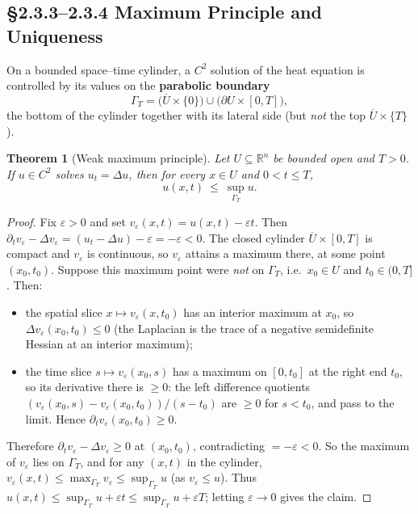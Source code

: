 ﻿\documentclass[12pt, a4paper]{article}
\renewcommand{\_}{\origunderscore\allowbreak}
\theoremstyle{definition}
\theoremstyle{plain}
\newtheorem{theorem}{Theorem}[section]
\begin{document}
\subsection{§2.3.3–2.3.4 Maximum Principle and Uniqueness}

On a bounded space–time cylinder, a $C^2$ solution of the heat equation is controlled by its
values on the \textbf{parabolic boundary}
\[
  \Gamma_T = \bigl(\overline U \times \{0\}\bigr) \cup \bigl(\partial U \times [0,T]\bigr),
\]
the bottom of the cylinder together with its lateral side (but \emph{not} the top
$\overline U \times \{T\}$).

\begin{theorem}[Weak maximum principle]
Let $U\subseteq\mathbb{R}^n$ be bounded open and $T>0$. If $u\in C^2$ solves $u_t=\Delta u$,
then for every $x\in U$ and $0<t\le T$,
\[
  u(x,t)\ \le\ \sup_{\Gamma_T} u .
\]
\end{theorem}

\begin{proof}
Fix $\varepsilon>0$ and set $v_\varepsilon(x,t)=u(x,t)-\varepsilon t$. Then
$\partial_t v_\varepsilon-\Delta v_\varepsilon=(u_t-\Delta u)-\varepsilon=-\varepsilon<0$.
The closed cylinder $\overline U\times[0,T]$ is compact and $v_\varepsilon$ is continuous, so
$v_\varepsilon$ attains a maximum there, at some point $(x_0,t_0)$. Suppose this maximum point
were \emph{not} on $\Gamma_T$, i.e.\ $x_0\in U$ and $t_0\in(0,T]$. Then:
\begin{itemize}
  \item the spatial slice $x\mapsto v_\varepsilon(x,t_0)$ has an interior maximum at $x_0$, so
    $\Delta v_\varepsilon(x_0,t_0)\le 0$ (the Laplacian is the trace of a negative semidefinite
    Hessian at an interior maximum);
  \item the time slice $s\mapsto v_\varepsilon(x_0,s)$ has a maximum on $[0,t_0]$ at the right
    end $t_0$, so its derivative there is $\ge 0$: the left difference quotients
    $(v_\varepsilon(x_0,s)-v_\varepsilon(x_0,t_0))/(s-t_0)$ are $\ge 0$ for $s<t_0$, and pass to
    the limit. Hence $\partial_t v_\varepsilon(x_0,t_0)\ge 0$.
\end{itemize}
Therefore $\partial_t v_\varepsilon-\Delta v_\varepsilon\ge 0$ at $(x_0,t_0)$, contradicting
$=-\varepsilon<0$. So the maximum of $v_\varepsilon$ lies on $\Gamma_T$, and for any $(x,t)$ in
the cylinder, $v_\varepsilon(x,t)\le\max_{\Gamma_T}v_\varepsilon\le\sup_{\Gamma_T}u$ (as
$v_\varepsilon\le u$). Thus $u(x,t)\le\sup_{\Gamma_T}u+\varepsilon t\le\sup_{\Gamma_T}u+\varepsilon T$;
letting $\varepsilon\to0$ gives the claim.
\end{proof}
\end{document}
